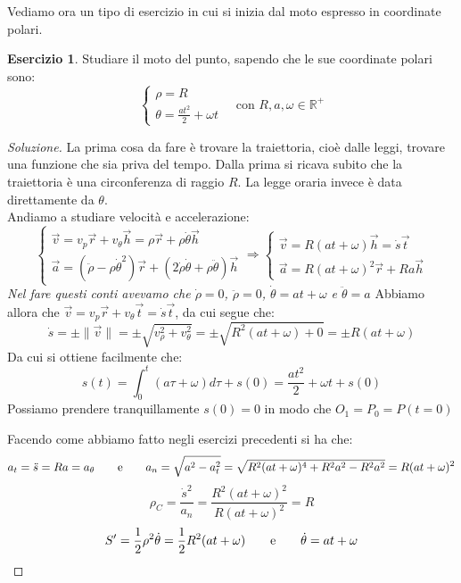 \documentclass[11pt,a4paper,twoside]{article}
\theoremstyle{definition}
\newtheorem{ese}{Esercizio}[section]
\newenvironment{sol}
	{\renewcommand\qedsymbol{$\blacksquare$}\begin{proof}[Soluzione]}
	{\end{proof}}
\begin{document}
Vediamo ora un tipo di esercizio in cui si inizia dal moto espresso in coordinate polari.

\begin{ese}
	Studiare il moto del punto, sapendo che le sue coordinate polari sono:
	\[ \begin{cases} \rho = R\\ \theta = \frac{at^2}{2} + \omega t \end{cases}\quad \text{con }R,a, \omega \in \mathbb R^+ \]
\end{ese}

\begin{sol}
	La prima cosa da fare è trovare la traiettoria, cioè dalle leggi, trovare una funzione che sia priva del tempo. Dalla prima si ricava subito che la traiettoria è una circonferenza di raggio $R$. La legge oraria invece è data direttamente da $\theta$.\\
	Andiamo a studiare velocità e accelerazione:
	\[
		\begin{cases}
			\vec v = v_p \vec r + v_\theta \vec h = \rho \vec r + \rho \dot \theta \vec h\\
			\vec a = (\ddot \rho - \rho \dot \theta^2) \vec r+(2 \dot \rho \dot \theta + \rho \ddot \theta)\vec h
		\end{cases} \Rightarrow
		\begin{cases}
			\vec v = R(at + \omega)\vec h = \dot s \vec t\\
			\vec a = R(at + \omega)^2 \vec r + Ra\vec h
		\end{cases}
	\]
	\textit{Nel fare questi conti avevamo che $\dot \rho = 0$, $\ddot \rho = 0$, $\dot \theta = at + \omega $ e $\ddot \theta =a$}
	Abbiamo allora che $\vec v = v_p \vec r + v_\theta \vec t = \dot s \vec t$, da cui segue che:
	\[\dot s = \pm \| \vec v \| = \pm \sqrt{v_\rho^2 + v_\theta^2} = \pm \sqrt{R^2(at + \omega) + 0} = \pm R(at + \omega)\]
	Da cui si ottiene facilmente che:
	\[ s(t) = \int_0^t (a \tau + \omega) d\tau + s(0) = \frac{at^2}2 + \omega t + s(0)\]
	Possiamo prendere tranquillamente $s(0) = 0$ in modo che $O_1 = P_0 = P(t=0)$

	Facendo come abbiamo fatto negli esercizi precedenti si ha che:
	\[ a_t = \ddot s = Ra = a_\theta \qquad \text e \qquad a_n = \sqrt{a^2-a_t^2} = \sqrt{R^2(at + \omega)^4 + R^2a^2 - R^2a^2} = R(at+\omega)^2\]
	\[\rho_C = \frac{\dot s^2}{a_n} = \frac{R^2(at + \omega)^2}{R(at + \omega)^2} = R\]
	\[ S' = \frac 12 \rho^2 \dot \theta = \frac 12 R^2(at + \omega)\qquad \text e \qquad \dot \theta = at + \omega \]
\end{sol}
\end{document}

